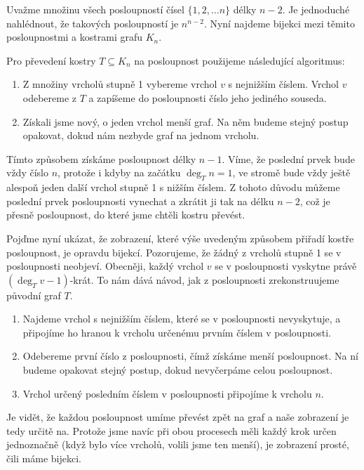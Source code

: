 \begin{t_proof}
  Uvažme množinu všech posloupností čísel $\{1,2,\dots n\}$ délky $n-2$. Je jednoduché nahlédnout, že takových posloupností je $n^{n-2}$. Nyní najdeme bijekci mezi těmito posloupnostmi a kostrami grafu $K_n$.
  
  Pro převedení kostry $T\subseteq K_n$ na posloupnost použijeme následující algoritmus:
  \begin{enumerate}
    \item Z množiny vrcholů stupně 1 vybereme vrchol $v$ s nejnižším číslem. Vrchol $v$ odebereme z $T$ a zapíšeme do posloupnosti číslo jeho jediného souseda.
    \item Získali jsme nový, o jeden vrchol menší graf. Na něm budeme stejný postup opakovat, dokud nám nezbyde graf na jednom vrcholu.
  \end{enumerate}
  
  Tímto způsobem získáme posloupnost délky $n-1$. Víme, že poslední prvek bude vždy číslo $n$, protože i kdyby na začátku $\deg_T n=1$, ve stromě bude vždy ještě alespoň jeden další vrchol stupně 1 s nižším číslem. Z tohoto důvodu můžeme poslední prvek posloupnosti vynechat a zkrátit ji tak na délku $n-2$, což je přesně posloupnost, do které jsme chtěli kostru převést.
  
  Pojďme nyní ukázat, že zobrazení, které výše uvedeným způsobem přiřadí kostře posloupnost, je opravdu bijekcí. Pozorujeme, že žádný z vrcholů stupně 1 se v posloupnosti neobjeví. Obecněji, každý vrchol $v$ se v posloupnosti vyskytne právě $(\deg_T v-1)$-krát. To nám dává návod, jak z posloupnosti zrekonstruujeme původní graf $T$.
  \begin{enumerate}
    \item Najdeme vrchol s nejnižším číslem, které se v posloupnosti nevyskytuje, a připojíme ho hranou k vrcholu určenému prvním číslem v posloupnosti.
    \item Odebereme první číslo z posloupnosti, čímž získáme menší posloupnost. Na ní budeme opakovat stejný postup, dokud nevyčerpáme celou posloupnost.
    \item Vrchol určený posledním číslem v posloupnosti připojíme k vrcholu $n$.
  \end{enumerate}
  
  Je vidět, že každou posloupnost umíme převést zpět na graf a naše zobrazení je tedy určitě na. Protože jsme navíc při obou procesech měli každý krok určen jednoznačně (když bylo více vrcholů, volili jsme ten menší), je zobrazení prosté, čili máme bijekci.
\end{t_proof}


